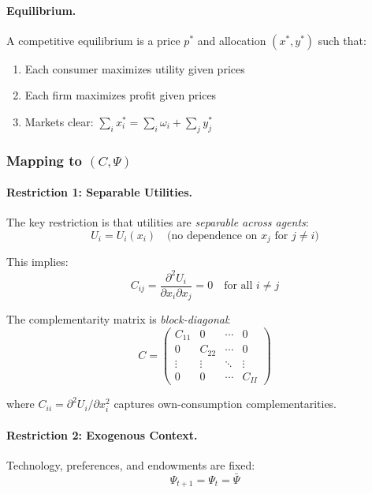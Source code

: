 \documentclass[12pt,a4paper]{article}
\begin{document}
\paragraph{Equilibrium.}
A competitive equilibrium is a price $p^*$ and allocation $(x^*, y^*)$ such that:
\begin{enumerate}
  \item Each consumer maximizes utility given prices
  \item Each firm maximizes profit given prices
  \item Markets clear: $\sum_i x_i^* = \sum_i \omega_i + \sum_j y_j^*$
\end{enumerate}

\subsubsection{Mapping to $(C, \Psi)$}

\paragraph{Restriction 1: Separable Utilities.}
The key restriction is that utilities are \emph{separable across agents}:
\begin{equation}
  U_i = U_i(x_i) \quad \text{(no dependence on } x_j \text{ for } j \neq i \text{)}
\end{equation}

This implies:
\begin{equation}
  C_{ij} = \frac{\partial^2 U_i}{\partial x_i \partial x_j} = 0 
  \quad \text{for all } i \neq j
  \label{eq:adseparability}
\end{equation}

The complementarity matrix is \emph{block-diagonal}:
\begin{equation}
  C = \begin{pmatrix}
    C_{11} & 0 & \cdots & 0 \\
    0 & C_{22} & \cdots & 0 \\
    \vdots & \vdots & \ddots & \vdots \\
    0 & 0 & \cdots & C_{II}
  \end{pmatrix}
\end{equation}

where $C_{ii} = \partial^2 U_i / \partial x_i^2$ captures own-consumption complementarities.

\paragraph{Restriction 2: Exogenous Context.}
Technology, preferences, and endowments are fixed:
\begin{equation}
  \Psi_{t+1} = \Psi_t = \bar{\Psi}
  \label{eq:adexogenous}
\end{equation}
\end{document}
